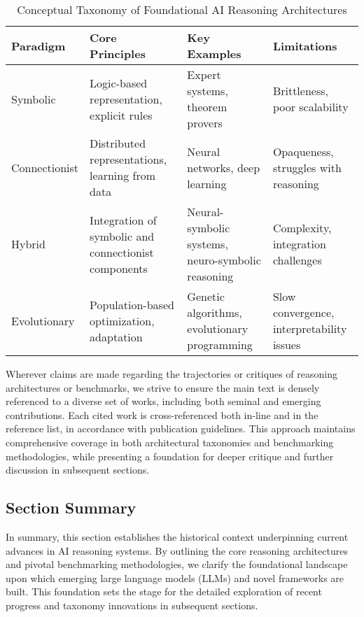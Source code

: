 \documentclass[sigconf]{acmart}
\begin{document}
\begin{table*}[htbp]
\centering
\caption{Conceptual Taxonomy of Foundational AI Reasoning Architectures}
\label{tab:architecture-taxonomy}
\begin{adjustbox}{max width=\textwidth}
\begin{tabular}{@{}llll@{}}
\toprule
Paradigm & Core Principles & Key Examples & Limitations \\
\midrule
Symbolic & Logic-based representation, explicit rules & Expert systems, theorem provers & Brittleness, poor scalability \\
Connectionist & Distributed representations, learning from data & Neural networks, deep learning & Opaqueness, struggles with reasoning \\
Hybrid & Integration of symbolic and connectionist components & Neural-symbolic systems, neuro-symbolic reasoning & Complexity, integration challenges \\
Evolutionary & Population-based optimization, adaptation & Genetic algorithms, evolutionary programming & Slow convergence, interpretability issues \\
\bottomrule
\end{tabular}
\end{adjustbox}
\end{table*}

Wherever claims are made regarding the trajectories or critiques of reasoning architectures or benchmarks, we strive to ensure the main text is densely referenced to a diverse set of works, including both seminal and emerging contributions. Each cited work is cross-referenced both in-line and in the reference list, in accordance with publication guidelines. This approach maintains comprehensive coverage in both architectural taxonomies and benchmarking methodologies, while presenting a foundation for deeper critique and further discussion in subsequent sections.

\subsection*{Section Summary}

In summary, this section establishes the historical context underpinning current advances in AI reasoning systems. By outlining the core reasoning architectures and pivotal benchmarking methodologies, we clarify the foundational landscape upon which emerging large language models (LLMs) and novel frameworks are built. This foundation sets the stage for the detailed exploration of recent progress and taxonomy innovations in subsequent sections.
\end{document}
